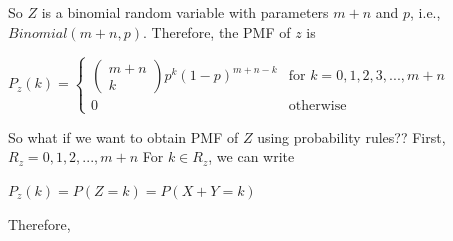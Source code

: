\documentclass{report}
\begin{document}
\noindent So $Z$ is a binomial random variable with parameters $m + n$ and $p$, i.e., $Binomial(m+n,p)$. Therefore, the PMF of $z$ is\newline
\centerline{$P_z(k) = 
\left\{\begin{matrix}
\begin{pmatrix}
m+n \\ 
k
\end{pmatrix} p^k(1-p)^{m+n-k} & \text{for } k = 0,1,2,3,...,m+n \\ 
0 & \text{otherwise}
\end{matrix}\right.$}\newline\newline

\noindent So what if we want to obtain PMF of $Z$ using probability rules??\newline
\noindent First, $R_z = {0,1,2,...,m+n}$\newline
\noindent For $k \in R_z$, we can write\newline
\centerline{$P_z(k)=P(Z=k)=P(X+Y=k)$}\newline
Therefore, \newline
\end{document}
